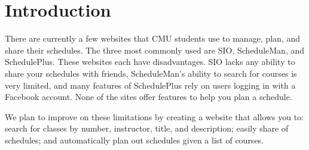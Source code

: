 \section{Introduction}
\setcounter{page}{1}  %
There are currently a few websites that CMU students use to manage, plan, and
share their schedules. The three most commonly used are SIO, ScheduleMan, and
SchedulePlus. These websites each have disadvantages. SIO lacks any ability to
share your schedules with friends, ScheduleMan's ability to search for courses
is very limited, and many features of SchedulePlus rely on users logging in with
a Facebook account.  None of the sites offer features to help you plan
a schedule.

We plan to improve on these limitations by creating a website that allows you
to: search for classes by number, instructor, title, and description; easily
share of schedules; and automatically plan out schedules given a list of courses.
